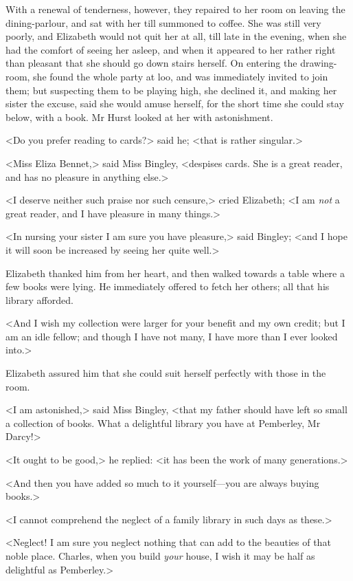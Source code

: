 With a renewal of tenderness, however, they repaired to her room on leaving the dining-parlour, and sat with her till summoned to coffee. She was still very poorly, and Elizabeth would not quit her at all, till late in the evening, when she had the comfort of seeing her asleep, and when it appeared to her rather right than pleasant that she should go down stairs herself. On entering the drawing-room, she found the whole party at loo, and was immediately invited to join them; but suspecting them to be playing high, she declined it, and making her sister the excuse, said she would amuse herself, for the short time she could stay below, with a book. Mr Hurst looked at her with astonishment.

<Do you prefer reading to cards?> said he; <that is rather singular.>

<Miss Eliza Bennet,> said Miss Bingley, <despises cards. She is a great reader, and has no pleasure in anything else.>

<I deserve neither such praise nor such censure,> cried Elizabeth; <I am \textit{not} a great reader, and I have pleasure in many things.>

<In nursing your sister I am sure you have pleasure,> said Bingley; <and I hope it will soon be increased by seeing her quite well.>

Elizabeth thanked him from her heart, and then walked towards a table where a few books were lying. He immediately offered to fetch her others; all that his library afforded.

<And I wish my collection were larger for your benefit and my own credit; but I am an idle fellow; and though I have not many, I have more than I ever looked into.>

Elizabeth assured him that she could suit herself perfectly with those in the room.

<I am astonished,> said Miss Bingley, <that my father should have left so small a collection of books. What a delightful library you have at Pemberley, Mr Darcy!>

<It ought to be good,> he replied: <it has been the work of many generations.>

<And then you have added so much to it yourself—you are always buying books.>

<I cannot comprehend the neglect of a family library in such days as these.>

<Neglect! I am sure you neglect nothing that can add to the beauties of that noble place. Charles, when you build \textit{your} house, I wish it may be half as delightful as Pemberley.>

